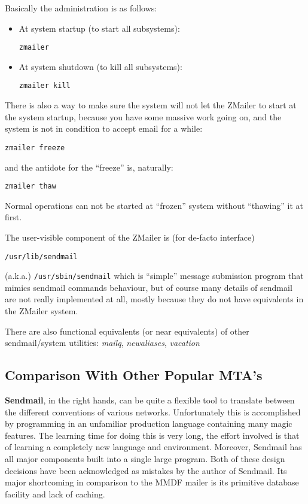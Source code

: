 Basically the administration is as follows:
\begin{itemize}
\item At system startup (to start all subsystems):
\begin{verbatim}
zmailer
\end{verbatim}
\item At system shutdown (to kill all subsystems):
\begin{verbatim}
zmailer kill
\end{verbatim}
\end{itemize}

There is also a way to make sure the system will not let the ZMailer
to start at the system startup, because you have some massive work
going on, and the system is not in condition to accept email for a while: 
\begin{verbatim}
zmailer freeze
\end{verbatim}

and the antidote for the ``freeze'' is, naturally:
\begin{verbatim}
zmailer thaw
\end{verbatim}

Normal operations can not be started at ``frozen'' system without ``thawing'' it at first.

The user-visible component of the ZMailer is (for de-facto interface)
\begin{verbatim}
/usr/lib/sendmail
\end{verbatim}

(a.k.a.) {\tt /usr/sbin/sendmail}
which is ``simple'' message submission program that mimics sendmail
commands behaviour, but of course many details of sendmail are
not really implemented at all, mostly because they do not have
equivalents in the ZMailer system.

There are also functional equivalents (or near equivalents) of
other sendmail/system utilities:  {\em mailq\/}, {\em newaliases\/}, {\em vacation\/}




\subsection{Comparison With Other Popular MTA's}

{\bf Sendmail}, in the right hands, can be quite a flexible tool to translate
between the different conventions of various networks.  Unfortunately this
is accomplished by programming in an unfamiliar production language
containing many magic features.  The learning time for doing this is very
long, the effort involved is that of learning a completely new language and
environment. Moreover, Sendmail has all major components built into a
single large program. Both of these design decisions have been acknowledged
as mistakes by the author of Sendmail.  Its major shortcoming in comparison
to the MMDF mailer is its primitive database facility and lack of caching.

